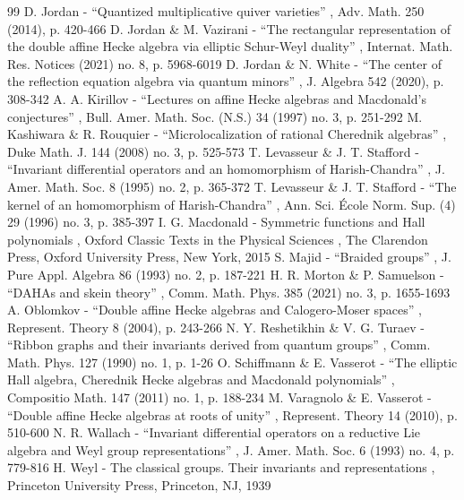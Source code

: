 \documentclass[11pt]{article}
\theoremstyle{definition}
\begin{document}
\begin{thebibliography}{99}
 D. Jordan - “Quantized multiplicative quiver varieties” , Adv. Math. 250 (2014), p. 420-466
 D. Jordan \& M. Vazirani - “The rectangular representation of the double affine Hecke algebra via elliptic Schur-Weyl duality” , Internat. Math. Res. Notices (2021) no. 8, p. 5968-6019
 D. Jordan \& N. White - “The center of the reflection equation algebra via quantum minors” , J. Algebra 542 (2020), p. 308-342
 A. A. Kirillov - “Lectures on affine Hecke algebras and Macdonald’s conjectures” , Bull. Amer. Math. Soc. (N.S.) 34 (1997) no. 3, p. 251-292
 M. Kashiwara \& R. Rouquier - “Microlocalization of rational Cherednik algebras” , Duke Math. J. 144 (2008) no. 3, p. 525-573
 T. Levasseur \& J. T. Stafford - “Invariant differential operators and an homomorphism of Harish-Chandra” , J. Amer. Math. Soc. 8 (1995) no. 2, p. 365-372
 T. Levasseur \& J. T. Stafford - “The kernel of an homomorphism of Harish-Chandra” , Ann. Sci. École Norm. Sup. (4) 29 (1996) no. 3, p. 385-397
 I. G. Macdonald - Symmetric functions and Hall polynomials , Oxford Classic Texts in the Physical Sciences , The Clarendon Press, Oxford University Press, New York, 2015
 S. Majid - “Braided groups” , J. Pure Appl. Algebra 86 (1993) no. 2, p. 187-221
 H. R. Morton \& P. Samuelson - “DAHAs and skein theory” , Comm. Math. Phys. 385 (2021) no. 3, p. 1655-1693
 A. Oblomkov - “Double affine Hecke algebras and Calogero-Moser spaces” , Represent. Theory 8 (2004), p. 243-266
 N. Y. Reshetikhin \& V. G. Turaev - “Ribbon graphs and their invariants derived from quantum groups” , Comm. Math. Phys. 127 (1990) no. 1, p. 1-26
 O. Schiffmann \& E. Vasserot - “The elliptic Hall algebra, Cherednik Hecke algebras and Macdonald polynomials” , Compositio Math. 147 (2011) no. 1, p. 188-234
 M. Varagnolo \& E. Vasserot - “Double affine Hecke algebras at roots of unity” , Represent. Theory 14 (2010), p. 510-600
 N. R. Wallach - “Invariant differential operators on a reductive Lie algebra and Weyl group representations” , J. Amer. Math. Soc. 6 (1993) no. 4, p. 779-816
 H. Weyl - The classical groups. Their invariants and representations , Princeton University Press, Princeton, NJ, 1939
\end{thebibliography}
\end{document}

